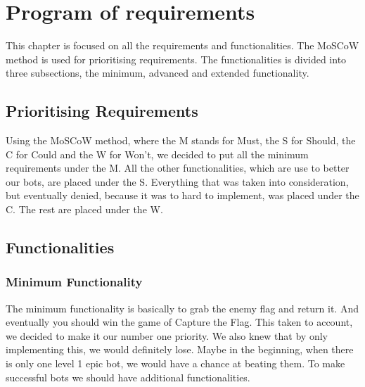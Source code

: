 \chapter{Program of requirements}
This chapter is focused on all the requirements and functionalities. The MoSCoW method is used for prioritising requirements. The functionalities is divided into three subsections, the minimum, advanced and extended functionality. 
\section{Prioritising Requirements}
Using the MoSCoW method, where the M stands for Must, the S for Should, the C for Could and the W for Won't, we decided to put all the minimum requirements under the M. All the other functionalities, which are use to better our bots, are placed under the S. Everything that was taken into consideration, but eventually denied, because it was to hard to implement, was placed under the C. The rest are placed under the W.\\

\section{Functionalities}

\subsection{Minimum Functionality}
The minimum functionality is basically to grab the enemy flag and return it. And eventually you should win the game of Capture the Flag. This taken to account, we decided to make it our number one priority. We also knew that by only implementing this, we would definitely lose. Maybe in the beginning, when there is only one level 1 epic bot, we would have a chance at beating them. To make successful bots we should have additional functionalities.\\ 

